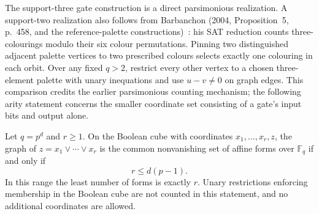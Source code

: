 The support-three gate construction is a direct parsimonious realization. A support-two realization also follows from Barbanchon (2004, Proposition~5, p.~458, and the reference-palette constructions)~\cite{st-barbanchon}: his SAT reduction counts three-colourings modulo their six colour permutations. Pinning two distinguished adjacent palette vertices to two prescribed colours selects exactly one colouring in each orbit. Over any fixed $q>2$, restrict every other vertex to a chosen three-element palette with unary inequations and use $u-v\ne0$ on graph edges. This comparison credits the earlier parsimonious counting mechanism; the following arity statement concerns the smaller coordinate set consisting of a gate's input bits and output alone.

\begin{theorem}
\label{ar:arity}
Let $q=p^d$ and $r\ge1$. On the Boolean cube with coordinates $x_1,\ldots,x_r,z$, the graph of $z=x_1\lor\cdots\lor x_r$ is the common nonvanishing set of affine forms over $\mathbb F_q$ if and only if
\[
                         r\le d(p-1).
\]
In this range the least number of forms is exactly $r$. Unary restrictions enforcing membership in the Boolean cube are not counted in this statement, and no additional coordinates are allowed.
\end{theorem}
